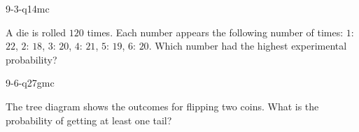 \begin{practiceQuestion}{9-3-q14}{mc}
\begin{questionText}
A die is rolled $120$ times. Each number appears the following number of times: $1$: $22$, $2$: $18$, $3$: $20$, $4$: $21$, $5$: $19$, $6$: $20$. Which number had the highest experimental probability?
\end{questionText}
\end{practiceQuestion}

\begin{practiceQuestion}{9-6-q27}{gmc}
\begin{questionText}
The tree diagram shows the outcomes for flipping two coins. What is the probability of getting at least one tail?

\begin{center}
\end{center}
\end{questionText}
\end{practiceQuestion}

